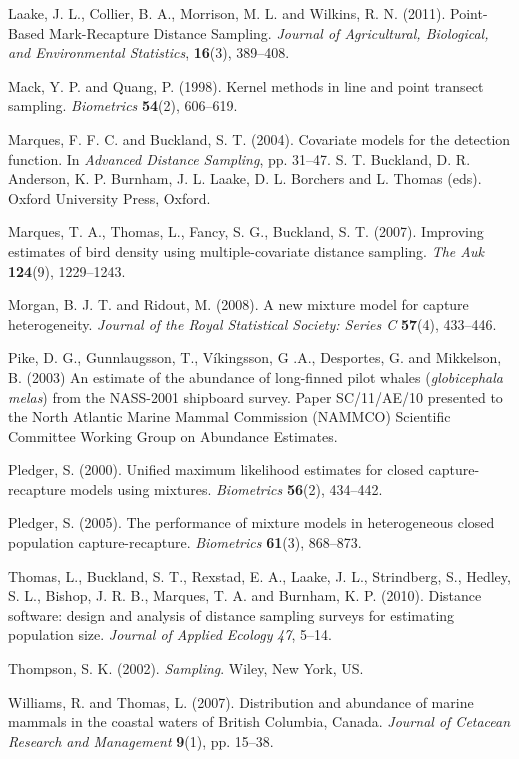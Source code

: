 \documentclass[useAMS,referee]{biom}
\begin{document}
\begin{thebibliography}{}
\bibitem{ } Laake, J. L., Collier, B. A., Morrison, M. L. and Wilkins, R. N. (2011). Point-Based Mark-Recapture Distance Sampling. \textit{Journal of Agricultural, Biological, and Environmental Statistics}, \textbf{16}(3), 389--408.

\bibitem{ } Mack, Y. P. and Quang, P. (1998). Kernel methods in line and point transect sampling. \textit{Biometrics} \textbf{54}(2), 606--619. 

\bibitem{ } Marques, F. F. C. and Buckland, S. T. (2004). Covariate models for the detection function. In \textit{Advanced Distance Sampling}, pp. 31--47. S. T. Buckland, D. R. Anderson, K. P. Burnham, J. L. Laake, D. L. Borchers and L. Thomas (eds). Oxford University Press, Oxford.

\bibitem{ } Marques, T. A., Thomas, L., Fancy, S. G., Buckland, S. T. (2007). Improving estimates of bird density using multiple-covariate distance sampling. \textit{The Auk} \textbf{124}(9), 1229--1243.

\bibitem{ } Morgan, B. J. T. and Ridout, M. (2008). A new mixture model for capture heterogeneity. \textit{Journal of the Royal Statistical Society: Series C} \textbf{57}(4), 433--446. 

\bibitem{ } Pike, D. G., Gunnlaugsson, T., V\'{i}kingsson, G .A., Desportes, G. and Mikkelson, B.  (2003) An estimate of the abundance of long-finned pilot whales (\textit{globicephala melas}) from the NASS-2001 shipboard survey. Paper SC/11/AE/10 presented to the North Atlantic Marine Mammal Commission (NAMMCO) Scientific Committee Working Group on Abundance Estimates.

\bibitem{ } Pledger, S. (2000). Unified maximum likelihood estimates for closed capture-recapture models using mixtures. \textit{Biometrics} \textbf{56}(2), 434--442. 

\bibitem{ } Pledger, S. (2005). The performance of mixture models in heterogeneous closed population capture-recapture. \textit{Biometrics} \textbf{61}(3), 868--873.

\bibitem{ } Thomas, L., Buckland, S. T., Rexstad, E. A., Laake, J. L., Strindberg, S., Hedley, S. L., Bishop, J. R. B., Marques, T. A. and Burnham, K. P. (2010). Distance software: design and analysis of distance sampling surveys for estimating population size. \textit{Journal of Applied Ecology} \textit{47}, 5--14.

\bibitem{ } Thompson, S. K. (2002). \textit{Sampling}. Wiley, New York, US.

\bibitem{ } Williams, R. and Thomas, L. (2007). Distribution and abundance of marine mammals in the coastal waters of British Columbia, Canada. \textit{Journal of Cetacean Research and Management} \textbf{9}(1), pp. 15--38.

\end{thebibliography}

\label{lastpage}
\end{document}
